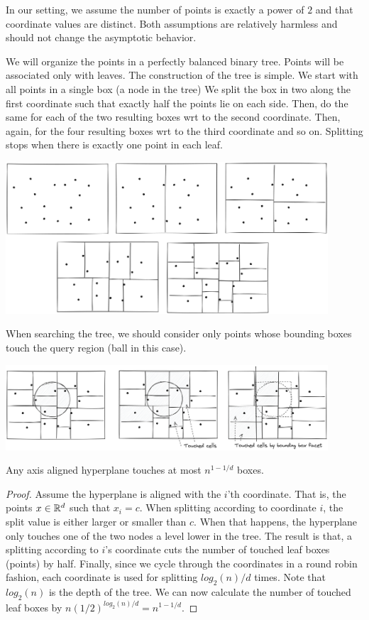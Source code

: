 \documentclass{article}
\begin{document}
In our setting, we assume the number of points is exactly a power of $2$ and that coordinate values are distinct. 
Both assumptions are relatively harmless and should not change the asymptotic behavior. 

We will organize the points in a perfectly balanced binary tree. Points will be associated only with leaves. 
The construction of the tree is simple. We start with all points in a single box (a node in the tree) 
We split the box in two along the first coordinate such that exactly half the points lie on each side.
Then, do the same for each of the two resulting boxes wrt to the second coordinate.
Then, again, for the four resulting boxes wrt to the third coordinate and so on.
Splitting stops when there is exactly one point in each leaf.


\begin{center}
\includegraphics[width=0.9\textwidth]{images/kdtrees-construction.png}
\end{center}


When searching the tree, we should consider only points whose bounding boxes touch the query region (ball in this case).

\begin{center}
\includegraphics[width=0.9\textwidth]{images/kdtrees-search.png}
\end{center}

\begin{fact}
Any axis aligned hyperplane touches at most $n^{1-1/d}$ boxes.
\end{fact}
\begin{proof}
Assume the hyperplane is aligned with the $i$'th coordinate. That is, the points $x\in{\mathbb{R}}^d$ such that $x_i = c$. 
When splitting according to coordinate $i$, the split value is either larger or smaller than $c$. 
When that happens, the hyperplane only touches one of the two nodes a level lower in the tree.
The result is that, a splitting according to $i$'s coordinate cuts the number of touched leaf boxes (points) by half.
Finally, since we cycle through the coordinates in a round robin fashion, each coordinate is used for splitting $log_2(n)/d$ times.
Note that $log_2(n)$ is the depth of the tree. We can now calculate the number of touched leaf boxes by $n (1/2)^{log_2(n)/d} = n^{1-1/d}$.
\end{proof}
\end{document}
